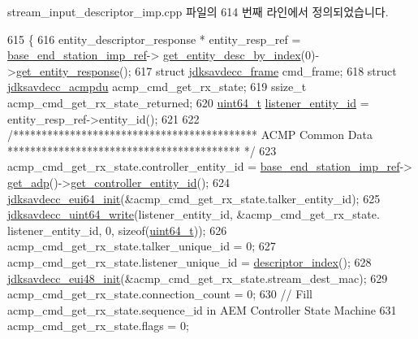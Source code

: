 stream\+\_\+input\+\_\+descriptor\+\_\+imp.\+cpp 파일의 614 번째 라인에서 정의되었습니다.


\begin{DoxyCode}
615 \{
616     entity\_descriptor\_response * entity\_resp\_ref = \hyperlink{classavdecc__lib_1_1descriptor__base__imp_a550c969411f5f3b69f55cc139763d224}{base\_end\_station\_imp\_ref}->
      \hyperlink{classavdecc__lib_1_1end__station__imp_a2039add3a7eb753152149e07a86ad008}{get\_entity\_desc\_by\_index}(0)->\hyperlink{classavdecc__lib_1_1entity__descriptor_ac31dd117f0c931ae93c8ba52df7211bd}{get\_entity\_response}();
617     \textcolor{keyword}{struct }\hyperlink{structjdksavdecc__frame}{jdksavdecc\_frame} cmd\_frame;
618     \textcolor{keyword}{struct }\hyperlink{structjdksavdecc__acmpdu}{jdksavdecc\_acmpdu} acmp\_cmd\_get\_rx\_state;
619     ssize\_t acmp\_cmd\_get\_rx\_state\_returned;
620     \hyperlink{parse_8c_aec6fcb673ff035718c238c8c9d544c47}{uint64\_t} \hyperlink{structjdksavdecc__acmpdu_ae204d36de673d5135ef97cc19a344b37}{listener\_entity\_id} = entity\_resp\_ref->entity\_id();
621 
622     \textcolor{comment}{/******************************************* ACMP Common Data *****************************************
      */}
623     acmp\_cmd\_get\_rx\_state.controller\_entity\_id = \hyperlink{classavdecc__lib_1_1descriptor__base__imp_a550c969411f5f3b69f55cc139763d224}{base\_end\_station\_imp\_ref}->
      \hyperlink{classavdecc__lib_1_1end__station__imp_a471a74540ce6182fad0c17dfd010107e}{get\_adp}()->\hyperlink{classavdecc__lib_1_1adp_a0c0959a46658c0a22e9530334b2912da}{get\_controller\_entity\_id}();
624     \hyperlink{group__eui64_ga6eda4ed21b6f0d526b180ac633eeba69}{jdksavdecc\_eui64\_init}(&acmp\_cmd\_get\_rx\_state.talker\_entity\_id);
625     \hyperlink{group__endian_gaa294fd85c2d887032dad294c6833c903}{jdksavdecc\_uint64\_write}(listener\_entity\_id, &acmp\_cmd\_get\_rx\_state.
      listener\_entity\_id, 0, \textcolor{keyword}{sizeof}(\hyperlink{parse_8c_aec6fcb673ff035718c238c8c9d544c47}{uint64\_t}));
626     acmp\_cmd\_get\_rx\_state.talker\_unique\_id = 0;
627     acmp\_cmd\_get\_rx\_state.listener\_unique\_id = \hyperlink{classavdecc__lib_1_1descriptor__base__imp_ac23c0a35276c07cfce8c8660700c2135}{descriptor\_index}();
628     \hyperlink{group__eui48_gae0bd9d7b819e8314b425d7c8bbae2333}{jdksavdecc\_eui48\_init}(&acmp\_cmd\_get\_rx\_state.stream\_dest\_mac);
629     acmp\_cmd\_get\_rx\_state.connection\_count = 0;
630     \textcolor{comment}{// Fill acmp\_cmd\_get\_rx\_state.sequence\_id in AEM Controller State Machine}
631     acmp\_cmd\_get\_rx\_state.flags = 0;

\end{DoxyCode}
